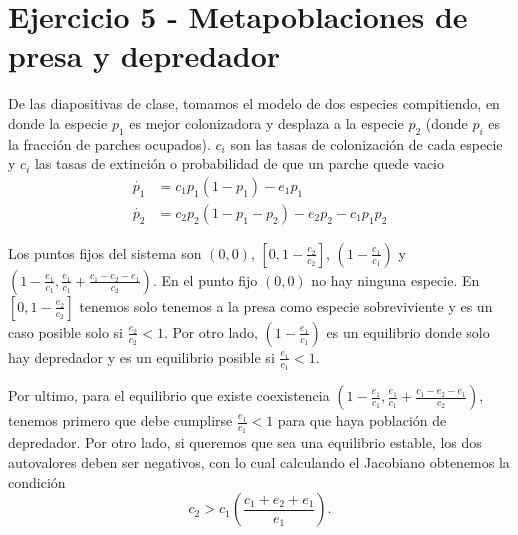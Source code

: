 \section*{Ejercicio 5 - Metapoblaciones de presa y depredador}

De las diapositivas de clase, tomamos el modelo de dos especies compitiendo, en donde la especie $p_1$ es mejor colonizadora y desplaza a la especie $p_2$ (donde $p_i$ es la fracción de parches ocupados). $c_i$ son las tasas de colonización de cada especie y $c_i$ las tasas de extinción o probabilidad de que un parche quede vacio
\begin{align}
    \dot{p_1} &= c_1 p_1 \left(1-p_1\right) -e_1 p_1 \\ 
    \dot{p_2} &= c_2 p_2 \left(1-p_1-p_2\right) -e_2 p _2 - c_1 p_1 p_2 
\end{align}

Los puntos fijos del sistema son $\left(0,0\right)$, $\left[0, 1-\frac{e_2}{c_2}\right]$, $\left(1-\frac{e_1}{c_1}\right)$ y $\left(1-\frac{e_1}{c_1}, \frac{e_1}{c_1} + \frac{c_1-e_2-e_1}{c_2}\right)$. En el punto fijo $\left(0,0\right)$ no hay ninguna especie. En $\left[0, 1-\frac{e_2}{c_2}\right]$ tenemos solo tenemos a la presa como especie sobreviviente y es un caso posible solo si $\frac{e_2}{c_2} < 1$. Por otro lado, $\left(1-\frac{e_1}{c_1}\right)$ es un equilibrio donde solo hay depredador y es un equilibrio posible si $\frac{e_1}{c_1} < 1$. 

Por ultimo, para el equilibrio que existe coexistencia $\left(1-\frac{e_1}{c_1}, \frac{e_1}{c_1} + \frac{c_1-e_2-e_1}{c_2}\right)$, tenemos primero que debe cumplirse $\frac{e_1}{c_1} < 1$ para que haya población de depredador. Por otro lado, si queremos que sea una equilibrio estable, los dos autovalores deben ser negativos, con lo cual calculando el Jacobiano obtenemos la condición
\begin{equation}
    c_2 > c_1 \left(\frac{c_1 + e_2 + e_1}{e_1}\right).
\end{equation}